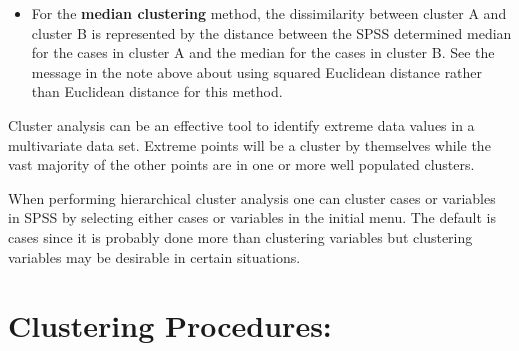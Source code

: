 \documentclass[a4paper,12pt]{article}
\begin{document}
\begin{itemize}
\item 
For the \textbf{median clustering} method, the dissimilarity between cluster A and cluster B is represented by the distance between the SPSS determined median for the cases in cluster A and the median for the cases in cluster B.  See the message in the note above about using squared Euclidean distance rather than Euclidean distance for this method.

\end{itemize}

Cluster analysis can be an effective tool to identify extreme data values in a multivariate data set.  Extreme points will be a cluster by themselves while the vast majority of the other points are in one or more well populated clusters.  

When performing hierarchical cluster analysis one can cluster cases or variables in SPSS by selecting either cases or variables in the initial menu.  The default is cases since it is probably done more than clustering variables but clustering variables may be desirable in certain situations.  

 
 \newpage
\section*{Clustering Procedures: }
\end{document}
